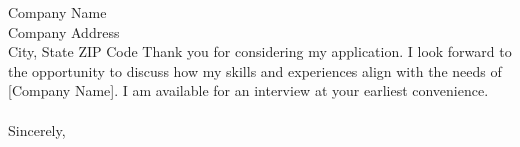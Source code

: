 \documentclass[a4paper,10pt]{letter}
\begin{document}
\begin{letter}{Company Name \\ Company Address \\ City, State ZIP Code}
Thank you for considering my application. I look forward to the opportunity to discuss how my skills and experiences align with the needs of [Company Name]. I am available for an interview at your earliest convenience.

\paragraph{} %

\closing{Sincerely,}

\end{letter}
\end{document}
